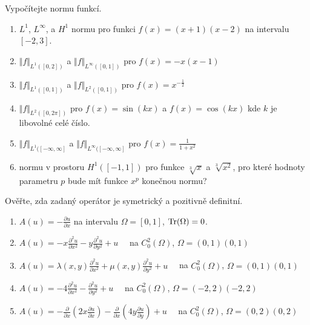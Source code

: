 \documentclass[a4paper,10pt]{book}
\def\Tr{{\rm Tr}}
\def\norm#1{\bigl\Vert#1\bigr\Vert} %
\begin{document}
\exercise \label{ex:norm7} Vypočítejte normu funkcí. 
\begin{enumerate}[label={\alph*)},itemsep=-2pt, topsep=-7pt]
         \item $L^1$, $L^\infty$, a $H^1$ normu pro funkci $f(x)=(x+1)(x-2)$ na intervalu $[-2,3]$.
         \item $\norm{f}_{L^1([0,2])}$ a $\norm{f}_{L^\infty([0,1])}$ pro $f(x)=-x(x-1)$
         \item $\norm{f}_{L^1([0,1])}$ a $\norm{f}_{L^2([0,1])}$ pro $f(x)=x^{-\frac12}$
         \item $\norm{f}_{L^2([0,2\pi])}$ pro $f(x) =\sin(kx)$ a $f(x)=\cos(kx)$ kde $k$ je libovolné celé číslo.
         \item $\norm{f}_{L^1([-\infty,\infty]}$ a $\norm{f}_{L^\infty([-\infty,\infty]}$  pro $f(x)=\frac{1}{1+x^2}$
         \item normu v prostoru $H^1([-1,1])$ pro funkce $\sqrt[3]{x}$ a $\sqrt[3]{x^2}$, pro které hodnoty parametru
                $p$ bude mít funkce $x^p$ konečnou normu?
\end{enumerate}
  
\exercise \label{ex:op1} Ověřte, zda zadaný operátor je symetrický a pozitivně definitní. \\
\begin{enumerate}[label=\alph*), itemsep=-3pt, topsep=-7pt]
\item $A(u)=-\frac{\partial u}{\partial x}$ na intervalu $\Omega=[0,1]$, $\Tr(\Omega)=0$.
\item $A(u)=-x\frac{\partial^2 u}{\partial x^2}-y \frac{\partial^2 u}{\partial y^2} + u \quad$ na $C^2_0(\Omega)$, $\Omega=(0,1)(0,1)$
\item $A(u)=\lambda(x,y)\frac{\partial^2 u}{\partial x^2} + \mu(x,y) \frac{\partial^2u}{\partial y^2} + u \quad$ na $C^2_0(\Omega)$, $\Omega=(0,1)(0,1)$
\item $A(u)=-4\frac{\partial^2 u}{\partial x^2}-\frac{\partial^2 u}{\partial y^2} + u \quad$ na $C^2_0(\Omega)$, $\Omega=(-2,2)(-2,2)$
\item $A(u)=-\frac{\partial}{\partial x}\left(2x\frac{\partial u}{\partial x}\right) 
            - \frac{\partial}{\partial x}\left(4y\frac{\partial u}{\partial y}\right) + u \quad$ na $C^2_0(\Omega)$, $\Omega=(0,2)(0,2)$
\end{enumerate}  
\end{document}

